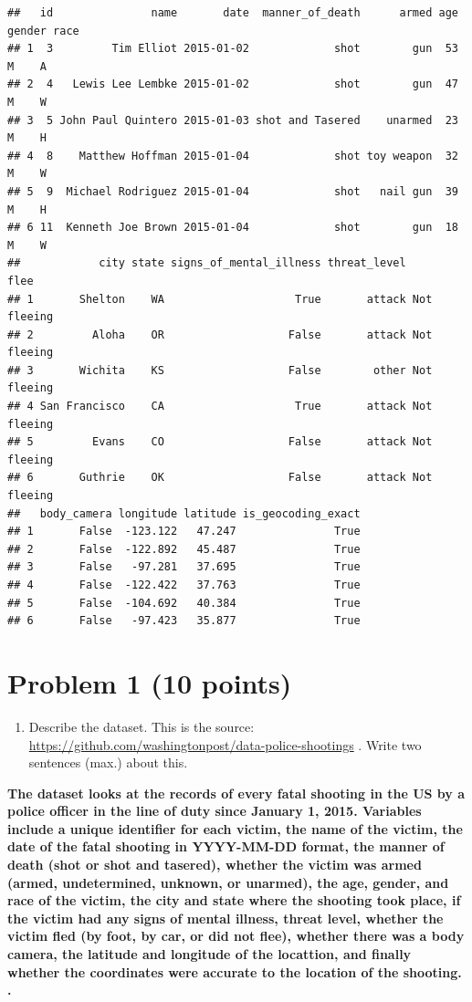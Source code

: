 \documentclass[
]{article}
\providecommand{\tightlist}{%
  \setlength{\itemsep}{0pt}\setlength{\parskip}{0pt}}
\begin{document}
\begin{verbatim}
##   id               name       date  manner_of_death      armed age gender race
## 1  3         Tim Elliot 2015-01-02             shot        gun  53      M    A
## 2  4   Lewis Lee Lembke 2015-01-02             shot        gun  47      M    W
## 3  5 John Paul Quintero 2015-01-03 shot and Tasered    unarmed  23      M    H
## 4  8    Matthew Hoffman 2015-01-04             shot toy weapon  32      M    W
## 5  9  Michael Rodriguez 2015-01-04             shot   nail gun  39      M    H
## 6 11  Kenneth Joe Brown 2015-01-04             shot        gun  18      M    W
##            city state signs_of_mental_illness threat_level        flee
## 1       Shelton    WA                    True       attack Not fleeing
## 2         Aloha    OR                   False       attack Not fleeing
## 3       Wichita    KS                   False        other Not fleeing
## 4 San Francisco    CA                    True       attack Not fleeing
## 5         Evans    CO                   False       attack Not fleeing
## 6       Guthrie    OK                   False       attack Not fleeing
##   body_camera longitude latitude is_geocoding_exact
## 1       False  -123.122   47.247               True
## 2       False  -122.892   45.487               True
## 3       False   -97.281   37.695               True
## 4       False  -122.422   37.763               True
## 5       False  -104.692   40.384               True
## 6       False   -97.423   35.877               True
\end{verbatim}

\hypertarget{problem-1-10-points}{%
\section{Problem 1 (10 points)}\label{problem-1-10-points}}

\begin{enumerate}
\def\labelenumi{\alph{enumi}.}
\tightlist
\item
  Describe the dataset. This is the source:
  \url{https://github.com/washingtonpost/data-police-shootings} . Write
  two sentences (max.) about this.
\end{enumerate}

\textbf{The dataset looks at the records of every fatal shooting in the
US by a police officer in the line of duty since January 1, 2015.
Variables include a unique identifier for each victim, the name of the
victim, the date of the fatal shooting in YYYY-MM-DD format, the manner
of death (shot or shot and tasered), whether the victim was armed
(armed, undetermined, unknown, or unarmed), the age, gender, and race of
the victim, the city and state where the shooting took place, if the
victim had any signs of mental illness, threat level, whether the victim
fled (by foot, by car, or did not flee), whether there was a body
camera, the latitude and longitude of the locattion, and finally whether
the coordinates were accurate to the location of the shooting. .}
\end{document}
